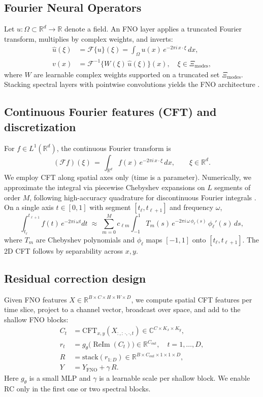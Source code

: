 \documentclass[11pt]{article}
\newcommand{\R}{\mathbb{R}}
\newcommand{\C}{\mathbb{C}}
\newcommand{\F}{\mathcal{F}}
\begin{document}
\subsection{Fourier Neural Operators}
Let $u\colon\Omega\subset\R^d\to\R$ denote a field. An FNO layer applies a truncated Fourier transform, multiplies by complex weights, and inverts:
\begin{align}
  \hat{u}(\xi) &= \F\{u\}(\xi) = \int_{\Omega} u(x)\,e^{-2\pi i\, x\cdot\xi}\,dx,\\
  v(x) &= \F^{-1}\{ W(\xi)\,\hat{u}(\xi) \}(x),\quad \xi\in\Xi_{\text{modes}},
\end{align}
where $W$ are learnable complex weights supported on a truncated set $\Xi_{\text{modes}}$. Stacking spectral layers with pointwise convolutions yields the FNO architecture \citep{Li2020FNO}.

\subsection{Continuous Fourier features (CFT) and discretization}
For $f\in L^1(\R^d)$, the continuous Fourier transform is
\begin{equation}
  (\F f)(\xi) \,=\, \int_{\R^d} f(x)\, e^{-2\pi i\, x\cdot\xi} \, dx,\qquad \xi\in\R^d.
\end{equation}
We employ CFT along spatial axes only (time is a parameter). Numerically, we approximate the integral via piecewise Chebyshev expansions on $L$ segments of order $M$, following high-accuracy quadrature for discontinuous Fourier integrals \citep{barnett2010conformal}. On a single axis $t\in[0,1]$ with segment $[t_\ell,t_{\ell+1}]$ and frequency $\omega$,
\begin{equation}
  \int_{t_\ell}^{t_{\ell+1}} f(t)\, e^{-2\pi i\, \omega t} dt \;\approx\; \sum_{m=0}^{M} c_{\ell m} \int_{-1}^{1} T_m(s)\, e^{-2\pi i\, \omega \, \phi_\ell(s)} \, \phi_\ell'(s)\, ds,
\end{equation}
where $T_m$ are Chebyshev polynomials and $\phi_\ell$ maps $[-1,1]$ onto $[t_\ell,t_{\ell+1}]$. The 2D CFT follows by separability across $x,y$.

\subsection{Residual correction design}
Given FNO features $X\in\R^{B\times C\times H\times W\times D}$, we compute spatial CFT features per time slice, project to a channel vector, broadcast over space, and add to the shallow FNO blocks:
\begin{align}
  C_t &= \text{CFT}_{x,y}(X_{:,:\,\cdot,\cdot, t})\in\C^{C\times K_x\times K_y},\\
  r_t &= g_\theta\big(\operatorname{ReIm}(C_t)\big) \in \R^{C_{\!out}},\quad t=1,\dots,D,\\
  R &= \mathrm{stack}(r_{1:D}) \in \R^{B\times C_{\!out}\times 1\times 1\times D},\\
  Y &= Y_{\text{FNO}} + \gamma\, R.
\end{align}
Here $g_\theta$ is a small MLP and $\gamma$ is a learnable scale per shallow block. We enable RC only in the first one or two spectral blocks.
\end{document}
